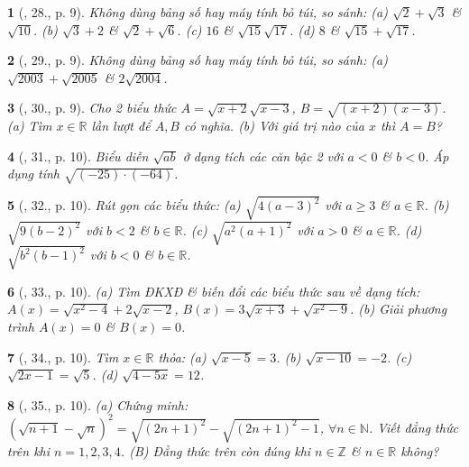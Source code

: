 \documentclass{article}
\newtheorem{baitoan}{}
\begin{document}
\begin{baitoan}[\cite{SBT_Toan_9_tap_1}, 28., p. 9]
	Không dùng bảng số hay máy tính bỏ túi, so sánh: (a) $\sqrt{2} + \sqrt{3}$ \& $\sqrt{10}$. (b) $\sqrt{3} + 2$ \& $\sqrt{2} + \sqrt{6}$. (c) $16$ \& $\sqrt{15}\sqrt{17}$. (d) $8$ \& $\sqrt{15} + \sqrt{17}$.
\end{baitoan}

\begin{baitoan}[\cite{SBT_Toan_9_tap_1}, 29., p. 9]
	Không dùng bảng số hay máy tính bỏ túi, so sánh: (a) $\sqrt{2003} + \sqrt{2005}$ \& $2\sqrt{2004}$.
\end{baitoan}

\begin{baitoan}[\cite{SBT_Toan_9_tap_1}, 30., p. 9]
	Cho 2 biểu thức $A = \sqrt{x + 2}\sqrt{x - 3}$, $B = \sqrt{(x + 2)(x - 3)}$. (a) Tìm $x\in\mathbb{R}$ lần lượt để $A,B$  có nghĩa. (b) Với giá trị nào của $x$ thì $A = B$?
\end{baitoan}

\begin{baitoan}[\cite{SBT_Toan_9_tap_1}, 31., p. 10]
	Biểu diễn $\sqrt{ab}$ ở dạng tích các căn bậc 2 với $a < 0$ \& $b < 0$. Áp dụng tính $\sqrt{(-25)\cdot(-64)}$.
\end{baitoan}

\begin{baitoan}[\cite{SBT_Toan_9_tap_1}, 32., p. 10]
	Rút gọn các biểu thức: (a) $\sqrt{4(a - 3)^2}$ với $a\ge3$ \& $a\in\mathbb{R}$. (b) $\sqrt{9(b - 2)^2}$ với $b < 2$ \& $b\in\mathbb{R}$. (c) $\sqrt{a^2(a + 1)^2}$ với $a > 0$ \& $a\in\mathbb{R}$. (d) $\sqrt{b^2(b - 1)^2}$ với $b < 0$ \& $b\in\mathbb{R}$.
\end{baitoan}

\begin{baitoan}[\cite{SBT_Toan_9_tap_1}, 33., p. 10]
	(a) Tìm ĐKXĐ \& biến đổi các biểu thức sau về dạng tích: $A(x) = \sqrt{x^2 - 4} + 2\sqrt{x - 2}$, $B(x) = 3\sqrt{x + 3} + \sqrt{x^2 - 9}$. (b) Giải phương trình $A(x) = 0$ \& $B(x) = 0$.
\end{baitoan}

\begin{baitoan}[\cite{SBT_Toan_9_tap_1}, 34., p. 10]
	Tìm $x\in\mathbb{R}$ thỏa: (a) $\sqrt{x - 5} = 3$. (b) $\sqrt{x - 10} = -2$. (c) $\sqrt{2x - 1} = \sqrt{5}$. (d) $\sqrt{4 - 5x} = 12$.
\end{baitoan}

\begin{baitoan}[\cite{SBT_Toan_9_tap_1}, 35., p. 10]
	(a) Chứng minh: $\left(\sqrt{n + 1} - \sqrt{n}\right)^2 = \sqrt{(2n + 1)^2} - \sqrt{(2n + 1)^2 - 1}$, $\forall n\in\mathbb{N}$. Viết đẳng thức trên khi $n = 1,2,3,4$. (B) Đẳng thức trên còn đúng khi $n\in\mathbb{Z}$ \& $n\in\mathbb{R}$ không?
\end{baitoan}
\end{document}
